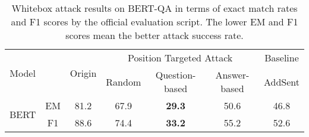 \begin{table*}[htp!]\small \setlength{\tabcolsep}{5pt}
\centering
\caption{Whitebox attack results on BERT-QA in terms of exact match rates and F1 scores by the official evaluation script. The lower EM and F1 scores mean the better attack success rate.}
 \label{WhiteboxQAHeuristic}
\begin{tabular}{ccccccc}
\toprule
\multirow{2}{*}{Model} & & \multirow{2}{*}{Origin} & \multicolumn{3}{c}{Position Targeted Attack}  & \multicolumn{1}{c}{Baseline} \\
\cmidrule(lr){4-6} \cmidrule(lr){7-7}
 & & & Random & Question-based  & Answer-based  & AddSent\\
\midrule

\multirow{2}{*}{BERT}  & EM & 81.2 & 67.9       & \textbf{29.3}           & 50.6                               & 46.8   \\
      & F1 & 88.6 & 74.4         & \textbf{33.2}         & 55.2    & 52.6   \\
\bottomrule
\end{tabular}
\end{table*}



